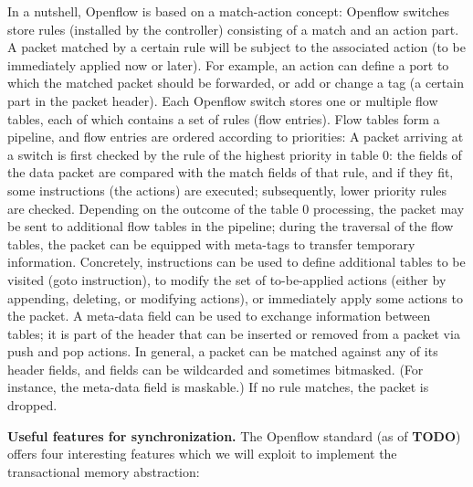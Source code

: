 \documentclass[conference]{sigcomm-alternate}
\begin{document}
In a nutshell,
Openflow
is based on a match-action concept: Openflow switches store
rules (installed by the controller) consisting of a match and an
action part. A packet matched by a certain rule will be subject
to the associated action (to be immediately applied now or later).
For example, an action can define a port to which the
matched packet should be forwarded, or add or change a tag
(a certain part in the packet header).
Each Openflow switch stores one or multiple flow tables,
each of which contains a set of rules (flow entries). Flow
tables form a pipeline, and flow entries are ordered according
to priorities: A packet arriving at a switch is first checked by
the rule of the highest priority in table 0: the fields of the
data packet are compared with the match fields of that rule,
and if they fit, some instructions (the actions) are executed;
subsequently, lower priority rules are checked. Depending on
the outcome of the table 0 processing, the packet may be sent
to additional flow tables in the pipeline; during the traversal of
the flow tables, the packet can be equipped with meta-tags to
transfer temporary information. Concretely, instructions can be
used to define additional tables to be visited (goto instruction),
to modify the set of to-be-applied actions (either by appending,
deleting, or modifying actions), or immediately apply some
actions to the packet. A meta-data field can be used to exchange
information between tables; it is part of the header that can be
inserted or removed from a packet via push and pop actions.
In general, a packet can be matched against any of its header
fields, and fields can be wildcarded and sometimes bitmasked.
(For instance, the meta-data field is maskable.) If no rule
matches, the packet is dropped.

\textbf{Useful features for synchronization.} The Openflow standard (as of \textbf{TODO}) offers four interesting
features which we will exploit to implement the transactional memory abstraction:
\end{document}
